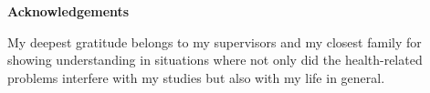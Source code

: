 \thispagestyle{plain}

\mbox{}
\vfill

\large
\noindent \textbf{Acknowledgements}
\normalsize

\noindent My deepest gratitude belongs to my supervisors and my closest family for showing understanding in situations where not only did the health-related problems interfere with my studies but also with my life in general.